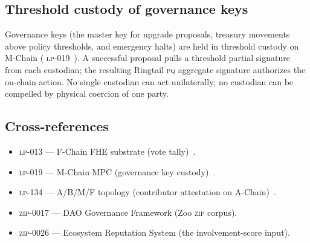 \subsection{Threshold custody of governance keys}

Governance keys (the master key for upgrade proposals, treasury
movements above policy thresholds, and emergency halts) are held in
threshold custody on M-Chain (\Lux{} \textsc{lp-019}~\cite{lp-019-mchain}).
A successful proposal pulls a threshold partial signature from each
custodian; the resulting Ringtail \textsc{pq} aggregate signature
authorizes the on-chain action. No single custodian can act
unilaterally; no custodian can be compelled by physical coercion of
one party.

\subsection{Cross-references}

\begin{itemize}[nosep,leftmargin=1.2em]
\item \Lux{} \textsc{lp-013} --- F-Chain FHE substrate (vote
  tally)~\cite{lp-013-fchain}.
\item \Lux{} \textsc{lp-019} --- M-Chain MPC (governance key
  custody)~\cite{lp-019-mchain}.
\item \Lux{} \textsc{lp-134} --- A/B/M/F topology (contributor
  attestation on A-Chain)~\cite{lp-134-topology}.
\item \textsc{zip-0017} --- DAO Governance Framework (Zoo \textsc{zip}
  corpus).
\item \textsc{zip-0026} --- Ecosystem Reputation System (the
  involvement-score input).
\end{itemize}
